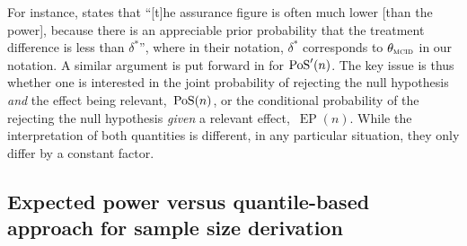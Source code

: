 \documentclass{article}
\newcommand{\EP}{\operatorname{EP}}
\begin{document}
For instance, \citet{o2001bayesian} states that
``[t]he assurance figure is often much lower [than the power], because there is an appreciable prior probability that the treatment difference is less than $\delta^*$'', where in their notation, $\delta^*$ corresponds to $\mcid$ in our notation.
A similar argument is put forward in \citet[Section~2]{rufibach_15} for $\operatorname{PoS}'(n)$.
The key issue is thus whether one is interested in the joint probability of rejecting the null hypothesis \emph{and}
the effect being relevant,~$\operatorname{PoS}(n)$, or
the conditional probability of the rejecting the null hypothesis \emph{given} a relevant effect,~$\EP(n)$.
While the interpretation of both quantities is different, in any particular situation, they only differ by a constant factor.



\subsection{Expected power versus quantile-based approach for sample size derivation}
\end{document}

